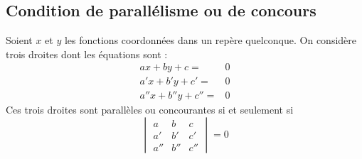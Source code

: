 \subsection{Condition de parallélisme ou de concours}
\begin{prop}
 Soient $x$ et $y$ les fonctions coordonnées dans un repère quelconque. On considère trois droites dont les équations sont :
\begin{align*}
 ax+by+c=&0\\ 
 a'x+b'y+c'=&0 \\
 a''x+b''y+c''=&0
\end{align*}
Ces trois droites sont parallèles ou concourantes si et seulement si
\begin{displaymath}
 \begin{vmatrix}
  a & b & c  \\
  a' & b' & c' \\
  a'' & b'' & c''
 \end{vmatrix}
= 0
\end{displaymath}
\end{prop}
